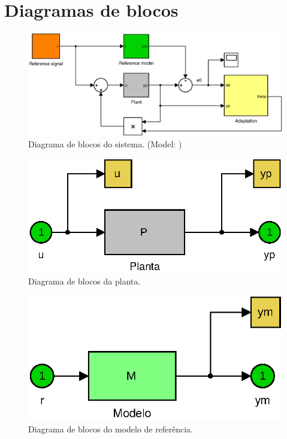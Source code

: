 ﻿%
\section{Diagramas de blocos}

 
\begin{figure}[H]
  \centering
  \includegraphics[width=14cm]{figs/blocks/MRAC_111_8_5.eps}
  \caption{Diagrama de blocos do sistema. \quad
  (Model: ) }
\end{figure}

\bigskip%
\begin{figure}[H]
  \centering
  \includegraphics[scale=0.8]{figs/blocks/plant.eps}
  \caption{Diagrama de blocos da planta.}
\end{figure}

\bigskip%
\begin{figure}[H]
  \centering
  \includegraphics[scale=0.8]{figs/blocks/reference-model.eps}
  \caption{Diagrama de blocos do modelo de referência.}
\end{figure}

